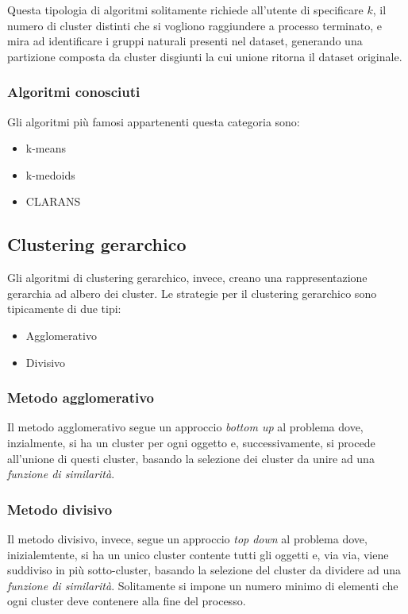 	Questa tipologia di algoritmi solitamente richiede all'utente di specificare $k$, il numero di cluster distinti che si vogliono raggiundere a processo terminato, e mira ad identificare i gruppi naturali presenti nel dataset, generando una partizione composta da cluster disgiunti la cui unione ritorna il dataset originale.
	
	\subsubsection{Algoritmi conosciuti}
		Gli algoritmi più famosi appartenenti questa categoria sono: 
		\begin{itemize}
		  	\item k-means
		  	\item k-medoids
		  	\item CLARANS
		\end{itemize}

\subsection{Clustering gerarchico}

	Gli algoritmi di clustering gerarchico, invece, creano una rappresentazione gerarchia ad albero dei cluster.
	Le strategie per il clustering gerarchico sono tipicamente di due tipi: 
	\begin{itemize}
		\item Agglomerativo
		\item Divisivo
	\end{itemize}
	
	\subsubsection{Metodo agglomerativo}
		Il metodo agglomerativo segue un approccio \emph{bottom up} al problema dove, inzialmente, si ha un cluster per ogni oggetto e, successivamente, si procede all'unione di questi cluster, basando la selezione dei cluster da unire ad una \emph{funzione di similarità}.

	\subsubsection{Metodo divisivo}
		Il metodo divisivo, invece, segue un approccio \emph{top down} al problema dove, inizialemtente, si ha un unico cluster contente tutti gli oggetti e, via via, viene suddiviso in più sotto-cluster, basando la selezione del cluster da dividere ad una \emph{funzione di similarità}. Solitamente si impone un numero minimo di elementi che ogni cluster deve contenere alla fine del processo. 

